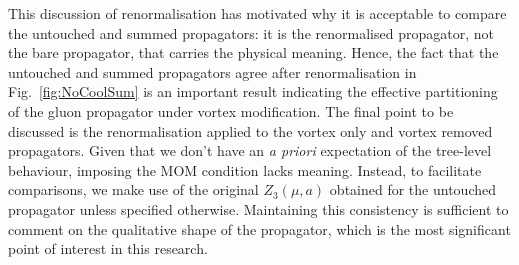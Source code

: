 This discussion of renormalisation has motivated why it is acceptable to compare the untouched and summed propagators: it is the renormalised propagator, not the bare propagator, that carries the physical meaning. Hence, the fact that the untouched and summed propagators agree after renormalisation in Fig.~\ref{fig:NoCoolSum} is an important result indicating the effective partitioning of the gluon propagator under vortex modification. The final point to be discussed is the renormalisation applied to the vortex only and vortex removed propagators. Given that we don't have an {\it a priori} expectation of the tree-level behaviour, imposing the MOM condition lacks meaning. Instead, to facilitate comparisons, we make use of the original $Z_3(\mu, a)$ obtained for the untouched propagator unless specified otherwise. Maintaining this consistency is sufficient to comment on the qualitative shape of the propagator, which is the most significant point of interest in this research. 


